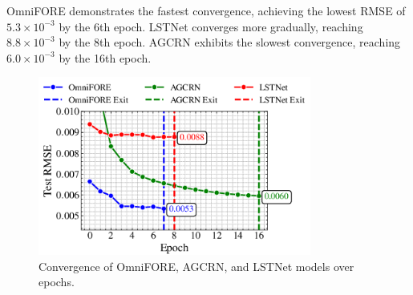 \documentclass{ieeetmlcn}
\begin{document}
OmniFORE demonstrates the fastest convergence, achieving the lowest RMSE of $5.3 \times 10^{-3}$ by the 6th epoch. LSTNet converges more gradually, reaching $8.8 \times 10^{-3}$ by the 8th epoch. AGCRN exhibits the slowest convergence, reaching $6.0 \times 10^{-3}$ by the 16th epoch.

\begin{figure}\centering
\centering
\centering\includegraphics[width=0.8\textwidth]{img/test_rmse_convergence_comparison.png}
\caption{Convergence of OmniFORE, AGCRN, and LSTNet models over epochs.}
\label{fig:test_rmse_convergence_comparison}
\end{figure}




\end{document}
